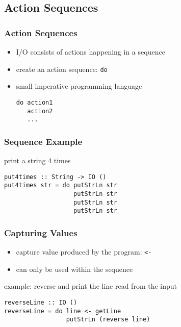 \documentclass[dvipsnames]{beamer}
\theoremstyle{plain}
\begin{document}
\subsection{Action Sequences}

\begin{frame}[fragile]
  \frametitle{Action Sequences}

  \begin{itemize}
    \item I/O consists of \alert{actions} happening in a sequence
    \item create an action sequence: \lstinline{do}
    \item small imperative programming language

    \medskip
    \begin{lstlisting}
do action1
   action2
   ...
    \end{lstlisting}
  \end{itemize}
\end{frame}

\begin{frame}[fragile]
  \frametitle{Sequence Example}

  \begin{exampleblock}{print a string 4 times}
    \begin{lstlisting}
put4times :: String -> IO ()
put4times str = do putStrLn str
                   putStrLn str
                   putStrLn str
                   putStrLn str
    \end{lstlisting}
  \end{exampleblock}
\end{frame}

\begin{frame}[fragile]
  \frametitle{Capturing Values}

  \begin{itemize}
    \item capture value produced by the program: \lstinline{<-}
    \item can only be used within the sequence
  \end{itemize}

  \begin{exampleblock}{example: reverse and print the line read from the input}
    \begin{lstlisting}
reverseLine :: IO ()
reverseLine = do line <- getLine
                 putStrLn (reverse line)
    \end{lstlisting}
  \end{exampleblock}
\end{frame}
\end{document}
